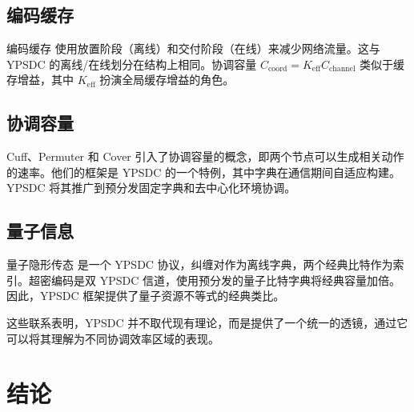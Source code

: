 \documentclass[12pt,a4paper]{article}
\theoremstyle{remark}
\begin{document}
	\subsection*{编码缓存}
	编码缓存 \cite{MaddahAli2014} 使用放置阶段（离线）和交付阶段（在线）来减少网络流量。这与 YPSDC 的离线/在线划分在结构上相同。协调容量 \(C_{\mathrm{coord}} = K_{\mathrm{eff}} C_{\mathrm{channel}}\) 类似于缓存增益，其中 \(K_{\mathrm{eff}}\) 扮演全局缓存增益的角色。
	
	\subsection*{协调容量}
	Cuff、Permuter 和 Cover \cite{Cuff2013} 引入了协调容量的概念，即两个节点可以生成相关动作的速率。他们的框架是 YPSDC 的一个特例，其中字典在通信期间自适应构建。YPSDC 将其推广到预分发固定字典和去中心化环境协调。
	
	\subsection*{量子信息}
	量子隐形传态 \cite{Bennett1993} 是一个 YPSDC 协议，纠缠对作为离线字典，两个经典比特作为索引。超密编码是双 YPSDC 信道，使用预分发的量子比特字典将经典容量加倍。因此，YPSDC 框架提供了量子资源不等式的经典类比。
	
	这些联系表明，YPSDC 并不取代现有理论，而是提供了一个统一的透镜，通过它可以将其理解为不同协调效率区域的表现。
	
	\clearpage
	\section{结论}
	
\end{document}
